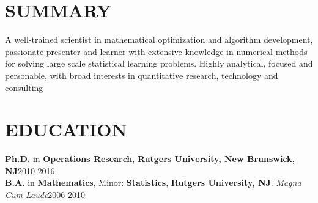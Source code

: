 \documentclass[10.5pt]{res} %
\begin{document}
\address{%
\quad Phone: (732) 447-6825~~E-mail:~~yaowang74\footnotesize{\MVAt}\normalsize{gmail.com}
~~Work Authorization: U.S. Citizen}%


\begin{resume}


\section{SUMMARY}
	A well-trained scientist in mathematical optimization and algorithm development, passionate presenter and learner with extensive knowledge in numerical methods for solving large scale statistical learning problems. Highly analytical, focused and personable, with broad interests in quantitative research, technology and consulting

\section{EDUCATION}
                \textbf{Ph.D.} in \textbf{Operations Research}, \textbf{Rutgers University, New Brunswick, NJ}\hfill 2010-2016\\
                \textbf{B.A.} in \textbf{Mathematics}, Minor: \textbf{Statistics}, \textbf{Rutgers University, NJ}. \emph{Magna Cum Laude}\hfill 2006-2010
%

\end{resume}
\end{document}
